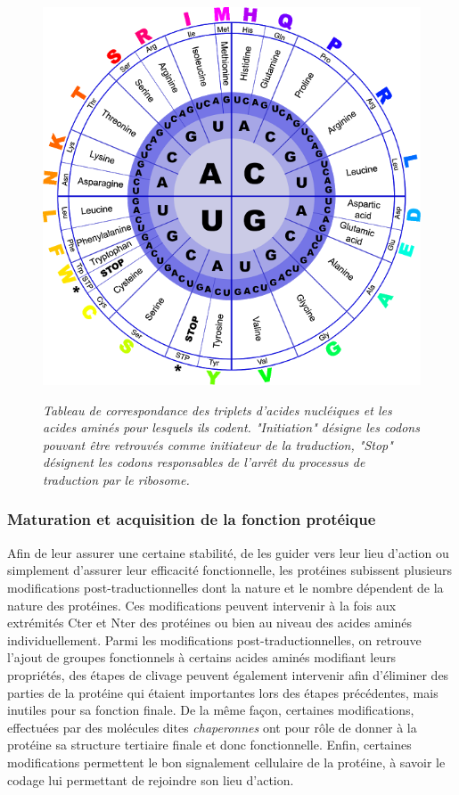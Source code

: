 \begin{figure}
  \centering
  {\includegraphics[width=0.75\linewidth]{./figures/ch1/codon_table_circle}}
    \caption{\it Tableau de correspondance des triplets d'acides nucléiques et les acides aminés pour lesquels ils codent. "Initiation" désigne les codons pouvant être retrouvés comme initiateur de la traduction, "Stop" désignent les codons responsables de l'arrêt du processus de traduction par le ribosome.}
    \label{Fig:codon_table}
  \hspace{0.2cm}
\end{figure}

\subsubsection{Maturation et acquisition de la fonction protéique}

Afin de leur assurer une certaine stabilité, de les guider vers leur lieu d'action ou simplement d'assurer leur efficacité fonctionnelle, les protéines subissent plusieurs modifications post-traductionnelles dont la nature et le nombre dépendent de la nature des protéines. Ces modifications peuvent intervenir à la fois aux extrémités Cter et Nter des protéines ou bien au niveau des acides aminés individuellement. Parmi les modifications post-traductionnelles, on retrouve l'ajout de groupes fonctionnels à certains acides aminés modifiant leurs propriétés, des étapes de clivage peuvent également intervenir afin d'éliminer des parties de la protéine qui étaient importantes lors des étapes précédentes, mais inutiles pour sa fonction finale. De la même façon, certaines modifications, effectuées par des molécules dites \textit{chaperonnes} ont pour rôle de donner à la protéine sa structure tertiaire finale et donc fonctionnelle. Enfin, certaines modifications permettent le bon signalement cellulaire de la protéine, à savoir le codage lui permettant de rejoindre son lieu d'action.

